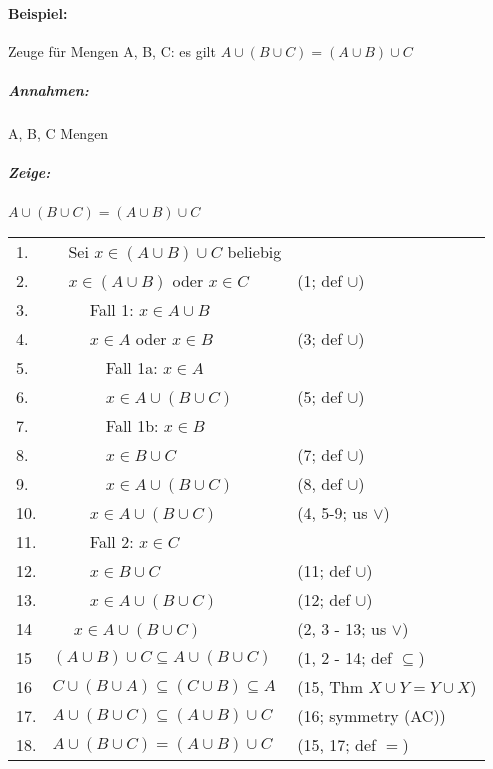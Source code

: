     \paragraph{Beispiel: }
        Zeuge für Mengen A, B, C: es gilt \(A \cup (B \cup C) = (A \cup B) \cup C\)
        \subparagraph{Annahmen:}
            A, B, C Mengen 
        \subparagraph{Zeige:}
            \(A \cup (B \cup C) = (A \cup B) \cup C\)
        
            \begin{tabular}{p{0.8cm}p{6cm}p{4cm}}
                1. & \(\quad\)Sei \(x \in (A \cup B) \cup C\) beliebig & \\
                2. & \(\quad\)\(x \in (A \cup B)\) oder \(x \in C\) & (1; def \(\cup\)) \\
                3. & \(\quad\)\(\quad\) Fall 1: \(x \in A \cup B\) & \\
                4. & \(\quad\)\(\quad\) \(x \in A\) oder \(x \in B\) & (3; def \(\cup\))\\
                5. & \(\quad\)\(\quad\)\(\quad\) Fall 1a: \(x \in A\) & \\
                6. & \(\quad\)\(\quad\)\(\quad\) \(x \in A \cup (B \cup C)\) & (5; def \(\cup\)) \\
                7. & \(\quad\)\(\quad\)\(\quad\) Fall 1b: \(x \in B\) & \\
                8. & \(\quad\)\(\quad\)\(\quad\) \(x \in B \cup C\) & (7; def \(\cup\))\\
                9. & \(\quad\)\(\quad\)\(\quad\) \(x \in A \cup (B \cup C)\) & (8, def \(\cup\)) \\
                10. & \(\quad\)\(\quad\) \(x \in A \cup (B \cup C)\) & (4, 5-9; us \(\vee\)) \\
                11. & \(\quad\)\(\quad\) Fall 2: \(x \in C\) & \\
                12. & \(\quad\)\(\quad\) \(x \in B \cup C\) & (11; def \(\cup\)) \\
                13. & \(\quad\)\(\quad\) \(x \in A \cup (B \cup C)\) & (12; def \(\cup\))\\
                14 & \(\quad\) \(x \in A \cup (B \cup C)\) & (2, 3 - 13; us \(\vee\))\\
                15 & \((A \cup B) \cup C \subseteq A \cup (B \cup C)\) & (1, 2 - 14; def \(\subseteq\)) \\
                16 & \(C \cup (B \cup A) \subseteq (C \cup B) \subseteq A\) & (15, Thm \(X \cup Y = Y \cup X\)) \\
                17. & \(A \cup (B \cup C) \subseteq (A \cup B) \cup C\) & (16; symmetry (AC)) \\
                18. & \(A \cup (B \cup C) = (A \cup B) \cup C\) & (15, 17; def \(=\))
            \end{tabular}
